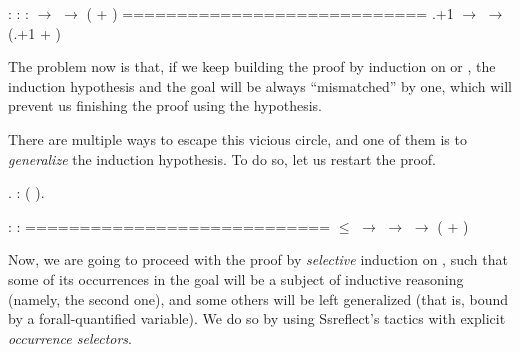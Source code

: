 \coqdoceol
\coqdocemptyline
\coqdocindent{1.00em}
 : \coqdoceol
\coqdocindent{1.00em}
 : \coqdoceol
\coqdocindent{1.00em}
 :   \ensuremath{\rightarrow}   \ensuremath{\rightarrow}  ( + )\coqdoceol
\coqdocindent{1.00em}
============================\coqdoceol
\coqdocindent{1.50em}
 .+1 \ensuremath{\rightarrow}   \ensuremath{\rightarrow}  (.+1 + )

\coqdocemptyline


The problem now is that, if we keep building the proof by induction on
 or , the induction hypothesis and the goal will be always
``mismatched'' by one, which will prevent us finishing the proof using
the hypothesis. 


There are multiple ways to escape this vicious circle, and one of them
is to \textit{generalize} the induction hypothesis. To do so, let us restart
the proof.


\begin{coqdoccode}
\coqdocemptyline
\coqdocnoindent
{}.\coqdoceol
\coqdocnoindent
{}: ( ).\coqdoceol
\coqdocemptyline
\end{coqdoccode}


\coqdoceol
\coqdocemptyline
\coqdocindent{1.00em}
 : \coqdoceol
\coqdocindent{1.00em}
 : \coqdoceol
\coqdocindent{1.00em}
============================\coqdoceol
\coqdocindent{1.50em}
 \ensuremath{\le}  \ensuremath{\rightarrow}   \ensuremath{\rightarrow}   \ensuremath{\rightarrow}  ( + )

\coqdocemptyline


Now, we are going to proceed with the proof by \textit{selective} induction
on , such that some of its occurrences in the goal will be a
subject of inductive reasoning (namely, the second one), and some
others will be left generalized (that is, bound by a forall-quantified
variable). We do so by using Ssreflect's tactics  with explicit
\textit{occurrence selectors}.  


